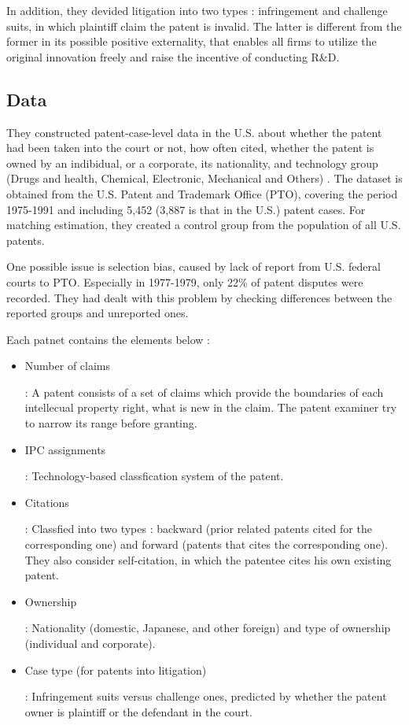 \documentclass{jsarticle}[12pt]
\begin{document}
  In addition, they devided litigation into two types : infringement and challenge suits, in which plaintiff claim the patent is invalid. The latter is different from the former in its possible positive externality, that enables all firms to utilize the original innovation freely and raise the incentive of conducting R\&D.
  
  \subsection{Data}
  
  They constructed patent-case-level data in the U.S. about whether the patent had been taken into the court or not, how often cited, whether the patent is owned by an indibidual, or a corporate, its nationality,  and technology group (Drugs and health, Chemical, Electronic, Mechanical and Others) . The dataset is obtained from the U.S. Patent and Trademark Office (PTO), covering the period 1975-1991 and including 5,452 (3,887 is that in the U.S.) patent cases. For matching estimation, they created a control group from the population of all U.S. patents. 
  
  One possible issue is selection bias, caused by lack of report from U.S. federal courts to PTO. Especially in 1977-1979, only 22\% of patent disputes were recorded. They had dealt with this problem by checking differences between the reported groups and unreported ones.
  
  Each patnet contains the elements below :
  
   \begin{itemize}
   
   \item Number of claims
   
   : A patent consists of a set of claims which provide the boundaries of each intellecual property right, what is new in the claim. The patent examiner try to narrow its range before granting.
   
   \item IPC assignments
   
   : Technology-based classfication system of the patent.
   
   \item Citations
   
   : Classfied into two types : backward (prior related patents cited for the corresponding one) and forward (patents that cites the corresponding one). They also consider self-citation, in which the patentee cites his own existing patent.
   
   \item Ownership
   
   : Nationality (domestic, Japanese, and other foreign) and type of ownership (individual and corporate).
   
   \item Case type (for patents into litigation)
   
   : Infringement suits versus challenge ones, predicted by whether the patent owner is plaintiff or the defendant in the court.
   
   \end{itemize}
  
\end{document}
